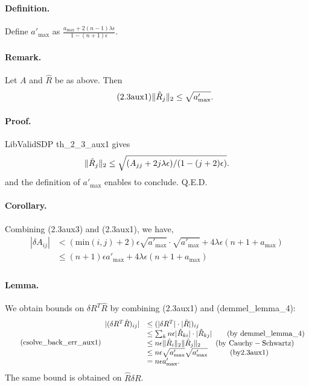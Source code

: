 \documentclass[a4paper]{article}
\begin{document}
\paragraph*{Definition.} Define $a'_\mathrm{max}$
as $\frac{a_\mathrm{max}+2(n-1)\lambda \epsilon}{1-(n+1)\epsilon}$.

\paragraph*{Remark.}  Let $A$ and $\hat{R}$ be as above.
Then
\begin{equation}\tag{2.3aux1}
  \lVert \hat{R}_j \rVert_2 \le \sqrt{a'_\mathrm{max}}.
  \end{equation}

\paragraph{Proof.} LibValidSDP   th\_2\_3\_aux1 gives
\begin{equation}
  \lVert \hat{R}_j \rVert_2 \le \sqrt{(A_{jj}+2j\lambda\epsilon)/(1-(j+2)\epsilon)}.
  \end{equation}
and the definition of $a'_\mathrm{max}$ enables to conclude. Q.E.D.

\paragraph{Corollary.} Combining (2.3aux3) and (2.3aux1), we have,
\begin{equation}\tag{cholesky\_back\_err}
\begin{array}{rl}
|\delta A_{ij}| & <
(\mathrm{min}(i,j)+2)\epsilon
\sqrt{a'_\mathrm{max}} \cdot \sqrt{a'_\mathrm{max}}
+ 4 \lambda\epsilon (n+1+a_\mathrm{max}) \\
& \le
(n+1)\epsilon
a'_\mathrm{max}
+ 4 \lambda\epsilon (n+1+a_\mathrm{max}) \\
\end{array}
\end{equation}

\paragraph*{Lemma.} We obtain bounds on $\delta R^T \hat{R}$ by
combining (2.3aux1) and (demmel\_lemma\_4):
\begin{equation}\tag{csolve\_back\_err\_aux1}
\begin{array}{rl}
|(\delta R^T\hat{R})_{ij}| & \le (|\delta R^T|\cdot|\hat{R}|)_{ij} \\
& \le  \sum_k n\epsilon |\hat{R}_{ki}|\cdot|\hat{R}_{kj}| \qquad \mathrm{(by~demmel\_lemma\_4)}\\
& \le n\epsilon \lVert \hat{R}_i \rVert_2 \lVert \hat{R}_j \rVert_2 \qquad \mathrm{(by~Cauchy-Schwartz)}\\
& \le n\epsilon \sqrt{a'_\mathrm{max}} \sqrt{a'_\mathrm{max}} \quad\qquad\mathrm{(by 2.3aux1)}\\
& = n\epsilon a'_\mathrm{max}.
\end{array}
\end{equation}
The same bound is obtained on $\hat{R}\delta R$.
\end{document}
